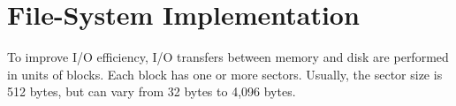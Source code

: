 \section{File-System Implementation}\label{sec:FS_Implementation}
To improve I/O efficiency, I/O transfers between memory and disk are performed in units of blocks.
Each block has one or more sectors.
Usually, the sector size is 512 bytes, but can vary from 32 bytes to 4,096 bytes.



